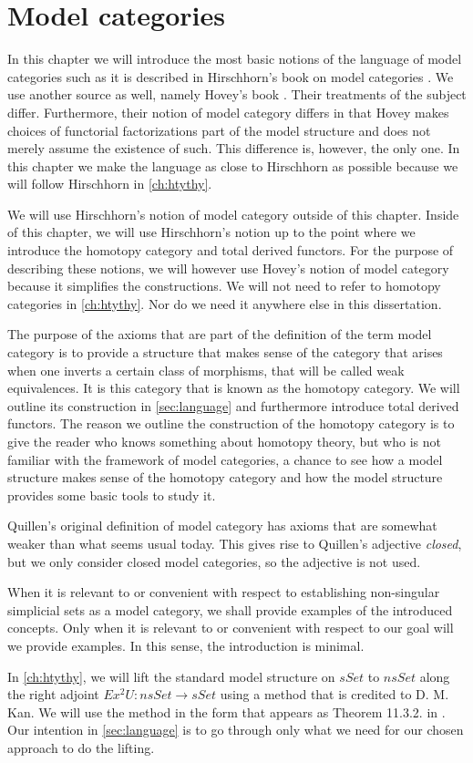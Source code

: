 
\chapter{Model categories}
\label{ch:model}

In this chapter we will introduce the most basic notions of the language of model categories such as it is described in Hirschhorn's book on model categories \cite{Hi03}. We use another source as well, namely Hovey's book \cite{Ho99}. Their treatments of the subject differ. Furthermore, their notion of model category differs in that Hovey makes choices of functorial factorizations part of the model structure and does not merely assume the existence of such. This difference is, however, the only one. In this chapter we make the language as close to Hirschhorn as possible because we will follow Hirschhorn in \cref{ch:htythy}.

We will use Hirschhorn's notion of model category outside of this chapter. Inside of this chapter, we will use Hirschhorn's notion up to the point where we introduce the homotopy category and total derived functors. For the purpose of describing these notions, we will however use Hovey's notion of model category because it simplifies the constructions. We will not need to refer to homotopy categories in \cref{ch:htythy}. Nor do we need it anywhere else in this dissertation.

The purpose of the axioms that are part of the definition of the term model category is to provide a structure that makes sense of the category that arises when one inverts a certain class of morphisms, that will be called weak equivalences. It is this category that is known as the homotopy category. We will outline its construction in \cref{sec:language} and furthermore introduce total derived functors. The reason we outline the construction of the homotopy category is to give the reader who knows something about homotopy theory, but who is not familiar with the framework of model categories, a chance to see how a model structure makes sense of the homotopy category and how the model structure provides some basic tools to study it.

Quillen's original definition \cite{Qu67} of model category has axioms that are somewhat weaker than what seems usual today. This gives rise to Quillen's adjective \emph{closed}, but we only consider closed model categories, so the adjective is not used.

When it is relevant to or convenient with respect to establishing non-singular simplicial sets as a model category, we shall provide examples of the introduced concepts. Only when it is relevant to or convenient with respect to our goal will we provide examples. In this sense, the introduction is minimal.

In \cref{ch:htythy}, we will lift the standard model structure on $sSet$ to $nsSet$ along the right adjoint $Ex^2U:nsSet\to sSet$ using a method that is credited to D. M. Kan. We will use the method in the form that appears as Theorem 11.3.2. in \cite[p.~214]{Hi03}. Our intention in \cref{sec:language} is to go through only what we need for our chosen approach to do the lifting.




